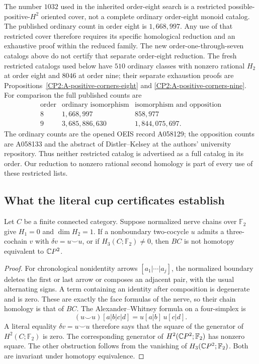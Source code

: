 \begin{remark*}
The number $1032$ used in the inherited order-eight search is
a restricted possible-positive-$H^2$ oriented cover, not a
complete ordinary order-eight monoid catalog. The published
ordinary count in order eight is $1,668,997$. Any use of that
restricted cover therefore requires its specific homological
reduction and an exhaustive proof within the reduced family.
The new order-one-through-seven catalogs above do not certify
that separate order-eight reduction.
The fresh restricted catalogs used below have $510$ ordinary classes
with nonzero rational $H_2$ at order eight and $8046$ at order nine;
their separate exhaustion proofs are
Propositions~\ref{CP2:A-positive-corners-eight} and
\ref{CP2:A-positive-corners-nine}. For comparison the full published
counts are
\[
\begin{array}{c|r|r}
\text{order}&\text{ordinary isomorphism}&\text{isomorphism and opposition}\\\hline
8&1,668,997&858,977\\
9&3,685,886,630&1,844,075,697.
\end{array}
\]
The ordinary counts are the opened OEIS record A058129; the opposition
counts are A058133 and the abstract of Distler--Kelsey at the authors'
university repository\cite{OEIS_A058129,OEIS_A058133,CP2-DistlerKelsey2009}.
Thus neither restricted catalog is advertised as a full catalog in its
order. Our reduction to nonzero rational second homology is part of
every use of these restricted lists.
\end{remark*}

\subsection{What the literal cup certificates establish}

\begin{proposition}
\label{CP2:A-cup-certificate}
Let $C$ be a finite connected category. Suppose normalized
nerve chains over $\mathbb F_2$ give $H_1=0$ and
$\dim H_2=1$. If a nonboundary two-cocycle $u$ admits a
three-cochain $v$ with $\delta v=u\smile u$, or if
$H_3(C;\mathbb F_2)\ne0$, then $BC$ is not homotopy equivalent
to $\mathbb{C}P^2$.
\end{proposition}
\begin{proof}
For chronological nonidentity arrows $[a_1|\cdots|a_j]$, the
normalized boundary deletes the first or last arrow or composes
an adjacent pair, with the usual alternating signs. A term
containing an identity after composition is degenerate and is
zero. These are exactly the face formulas of the nerve, so
their chain homology is that of $BC$.
The Alexander--Whitney formula on a four-simplex is
\[
(u\smile u)[a|b|c|d]=u[a|b]\,u[c|d].
\]
A literal equality $\delta v=u\smile u$ therefore says that
the square of the generator of $H^2(C;\mathbb F_2)$ is zero.
The corresponding generator of $H^2(\mathbb{C}P^2;\mathbb F_2)$ has
nonzero square. The other obstruction follows from the
vanishing of $H_3(\mathbb{C}P^2;\mathbb F_2)$. Both are invariant
under homotopy equivalence.
\end{proof}

